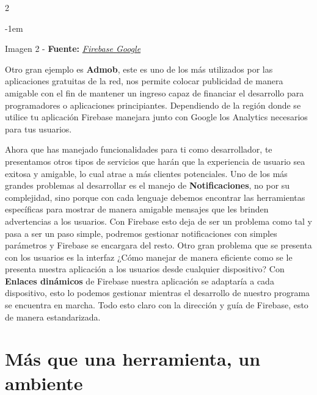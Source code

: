 \documentclass[12pt,spanish,Letterpaper,openany]{book}
\newenvironment{smalltextenv}
  {\begin{center}\kern-1em\color{fondotitulo}\small}%
  {\end{center}}%
\newenvironment{centerimageenv}
  {\noindent \begin{center}}%
  {\end{center}}%
\begin{document}
\begin {multicols}{2}
\begin {centerimageenv}
\end {centerimageenv}

\begin {smalltextenv}

Imagen 2 - \textbf{Fuente:} \emph{\href{https://firebase.google.com/docs/auth/images/auth-providers.png}{Firebase Google}}

\end {smalltextenv}

Otro gran ejemplo es \textbf{Admob}, este es uno de los más utilizados por las aplicaciones gratuitas de la red, nos permite colocar publicidad de manera amigable con el fin de mantener un ingreso capaz de financiar el desarrollo para programadores o aplicaciones principiantes. Dependiendo de la región donde se utilice tu aplicación Firebase manejara junto con Google los Analytics necesarios para tus usuarios.

Ahora que has manejado funcionalidades para ti como desarrollador, te presentamos otros tipos de servicios que harán que la experiencia de usuario sea exitosa y amigable, lo cual atrae a más clientes potenciales. Uno de los más grandes problemas al desarrollar es el manejo de \textbf{Notificaciones}, no por su complejidad, sino porque con cada lenguaje debemos encontrar las herramientas específicas para mostrar de manera amigable mensajes que les brinden advertencias a los usuarios. Con Firebase esto deja de ser un problema como tal y pasa a ser un paso simple, podremos gestionar notificaciones con simples parámetros y Firebase se encargara del resto. Otro gran problema que se presenta con los usuarios es la interfaz ¿Cómo manejar de manera eficiente como se le presenta nuestra aplicación a los usuarios desde cualquier dispositivo? Con \textbf{Enlaces dinámicos} de Firebase nuestra aplicación se adaptaría a cada dispositivo, esto lo podemos gestionar mientras el desarrollo de nuestro programa se encuentra en marcha. Todo esto claro con la dirección y guía de Firebase, esto de manera estandarizada.

\hypertarget{muxe1s-que-una-herramienta-un-ambiente}{%
\section{Más que una herramienta, un ambiente}\label{muxe1s-que-una-herramienta-un-ambiente}}


\end{multicols}
\end{document}
